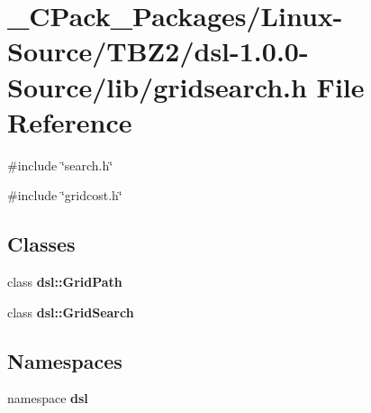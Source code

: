 \section{\_\-CPack\_\-Packages/Linux-\/Source/TBZ2/dsl-\/1.0.0-\/Source/lib/gridsearch.h File Reference}
\label{__CPack__Packages_2Linux-Source_2TBZ2_2dsl-1_80_80-Source_2lib_2gridsearch_8h}
{\ttfamily \#include \char`\"{}search.h\char`\"{}}\par
{\ttfamily \#include \char`\"{}gridcost.h\char`\"{}}\par
\subsection*{Classes}
\begin{DoxyCompactItemize}
\item 
class {\bf dsl::GridPath}
\item 
class {\bf dsl::GridSearch}
\end{DoxyCompactItemize}
\subsection*{Namespaces}
\begin{DoxyCompactItemize}
\item 
namespace {\bf dsl}
\end{DoxyCompactItemize}
